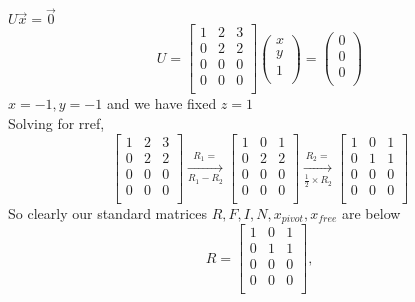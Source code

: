 \documentclass[a4paper,11pt]{article}
\numberwithin{equation}{section}
\begin{document}
\begin{itemize}
\begin{center}
    \vspace{5pt}
    $U\vec{x}=\vec{0}$
    \[U=
        \begin{bmatrix}
            1&2&3\\0&2&2\\0&0&0\\0&0&0\\
        \end{bmatrix} 
        \begin{pmatrix}
            x\\y\\1\\
        \end{pmatrix}=
        \begin{pmatrix}
            0\\0\\0\\
        \end{pmatrix}
    \]
        $x=-1,y=-1$ and we have fixed $z=1$\\
        \vspace{10pt}
        Solving for rref,
        \[
            \begin{bmatrix}
                1&2&3\\0&2&2\\0&0&0\\0&0&0\\
            \end{bmatrix} \xrightarrow[R_1-R_2]{R_1=}
            \begin{bmatrix}
                1&0&1\\0&2&2\\0&0&0\\0&0&0\\
            \end{bmatrix} \xrightarrow[\frac{1}{2}\times R_2]{R_2=}
            \begin{bmatrix}
                1&0&1\\0&1&1\\0&0&0\\0&0&0\\
            \end{bmatrix} 
        \]
    So clearly our standard matrices $R,F,I,N,x_{pivot},x_{free}$ are below
    \[R=
        \begin{bmatrix}
            1&0&1\\0&1&1\\0&0&0\\0&0&0\\
        \end{bmatrix},
\]
\end{center}
\end{itemize}
\end{document}
